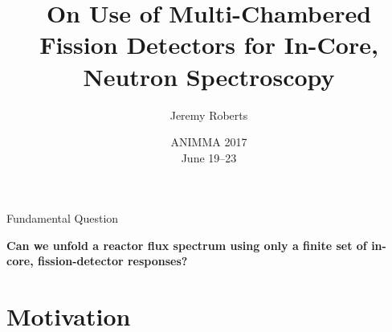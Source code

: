\documentclass[fleqn]{beamer}
\title[In-Core Neutron Spectroscopy]{
    On Use of Multi-Chambered Fission Detectors for In-Core, Neutron Spectroscopy}
\author[J. Roberts]{
    Jeremy Roberts}
\institute[Kansas State University]{
    Assistant Professor \\
    Mechanical and Nuclear Engineering \\
    Kansas State University}
\date[ANIMMA 2017]{
    ANIMMA 2017 \\
    June 19--23}
\begin{document}
    \newcommand{\beginbackup}{
        \newcounter{framenumbervorappendix}
        \setcounter{framenumbervorappendix}{\value{framenumber}}
    }
    \newcommand{\backupend}{
        \addtocounter{framenumbervorappendix}{-\value{framenumber}}
        \addtocounter{framenumber}{\value{framenumbervorappendix}} 
    }
    
    \begin{frame}
        \titlepage
    \end{frame}
    
    \begin{frame}{Fundamental Question}
       \begin{center}
         {\bf\Large Can we unfold a reactor flux spectrum using only a 
         finite set of in-core, fission-detector responses?}
       \end{center}
    \end{frame}
    
    \section{Motivation}
    
\end{document}
